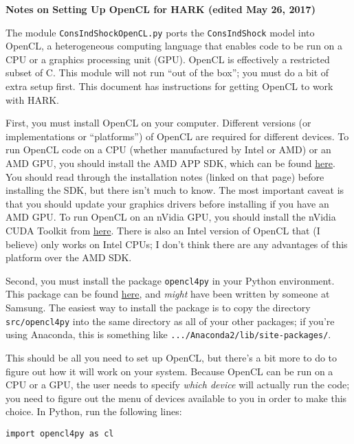 \documentclass[12pt,pdftex,letterpaper]{article}
\begin{document}
\begin{center}
\textbf{Notes on Setting Up OpenCL for HARK (edited May 26, 2017)}
\end{center}

The module \texttt{ConsIndShockOpenCL.py} ports the \texttt{ConsIndShock} model into OpenCL, a heterogeneous computing language that enables code to be run on a CPU or a graphics processing unit (GPU).  OpenCL is effectively a restricted subset of C.  This module will not run ``out of the box''; you must do a bit of extra setup first.  This document has instructions for getting OpenCL to work with HARK.

First, you must install OpenCL on your computer.  Different versions (or implementations or ``platforms'') of OpenCL are required for different devices.  To run OpenCL code on a CPU (whether manufactured by Intel or AMD) or an AMD GPU, you should install the AMD APP SDK, which can be found \href{http://developer.amd.com/tools-and-sdks/opencl-zone/amd-accelerated-parallel-processing-app-sdk/}{here}.  You should read through the installation notes (linked on that page) before installing the SDK, but there isn't much to know.  The most important caveat is that you should update your graphics drivers before installing if you have an AMD GPU.  To run OpenCL on an nVidia GPU, you should install the nVidia CUDA Toolkit from \href{https://developer.nvidia.com/cuda-downloads}{here}.  There is also an Intel version of OpenCL that (I believe) only works on Intel CPUs; I don't think there are any advantages of this platform over the AMD SDK.

Second, you must install the package \texttt{opencl4py} in your Python environment.  This package can be found \href{https://pypi.python.org/pypi/opencl4py/1.0.1}{here}, and \textit{might} have been written by someone at Samsung.  The easiest way to install the package is to copy the directory \texttt{src/opencl4py} into the same directory as all of your other packages; if you're using Anaconda, this is something like \texttt{.../Anaconda2/lib/site-packages/}.

This should be all you need to set up OpenCL, but there's a bit more to do to figure out how it will work on your system.  Because OpenCL can be run on a CPU or a GPU, the user needs to specify \textit{which device} will actually run the code; you need to figure out the menu of devices available to you in order to make this choice.  In Python, run the following lines:

\texttt{import opencl4py as cl}
\end{document}
